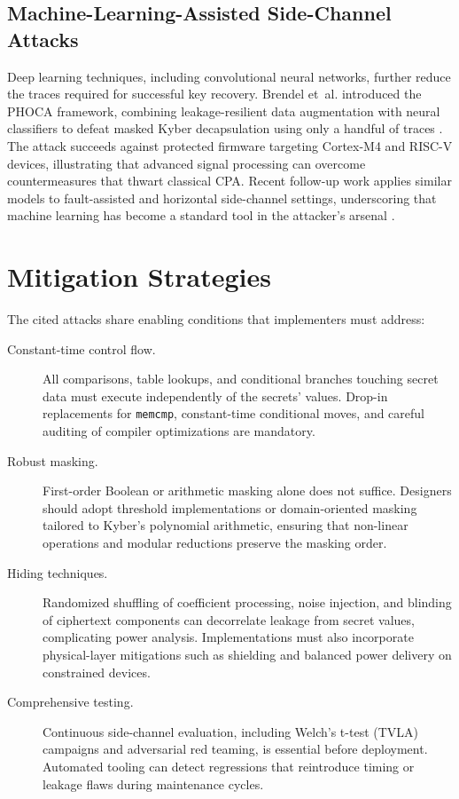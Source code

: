 \documentclass[11pt,a4paper]{article}
\begin{document}
\subsection{Machine-Learning-Assisted Side-Channel Attacks}
Deep learning techniques, including convolutional neural networks, further reduce the traces required for successful key recovery.
Brendel et~al. introduced the PHOCA framework, combining leakage-resilient data augmentation with neural classifiers to defeat masked Kyber decapsulation using only a handful of traces \cite{brendel2021phoca}.
The attack succeeds against protected firmware targeting Cortex-M4 and RISC-V devices, illustrating that advanced signal processing can overcome countermeasures that thwart classical CPA.
Recent follow-up work applies similar models to fault-assisted and horizontal side-channel settings, underscoring that machine learning has become a standard tool in the attacker's arsenal \cite{reparaz2023mlsca}.

\section{Mitigation Strategies}
\label{sec:countermeasures}
The cited attacks share enabling conditions that implementers must address:

\begin{description}
    \item[Constant-time control flow.] All comparisons, table lookups, and conditional branches touching secret data must execute independently of the secrets' values.
    Drop-in replacements for \texttt{memcmp}, constant-time conditional moves, and careful auditing of compiler optimizations are mandatory.
    
    \item[Robust masking.] First-order Boolean or arithmetic masking alone does not suffice.
    Designers should adopt threshold implementations or domain-oriented masking tailored to Kyber's polynomial arithmetic, ensuring that non-linear operations and modular reductions preserve the masking order.
    
    \item[Hiding techniques.] Randomized shuffling of coefficient processing, noise injection, and blinding of ciphertext components can decorrelate leakage from secret values, complicating power analysis.
    Implementations must also incorporate physical-layer mitigations such as shielding and balanced power delivery on constrained devices.
    
    \item[Comprehensive testing.] Continuous side-channel evaluation, including Welch's t-test (TVLA) campaigns and adversarial red teaming, is essential before deployment.
    Automated tooling can detect regressions that reintroduce timing or leakage flaws during maintenance cycles.
\end{description}
\end{document}
